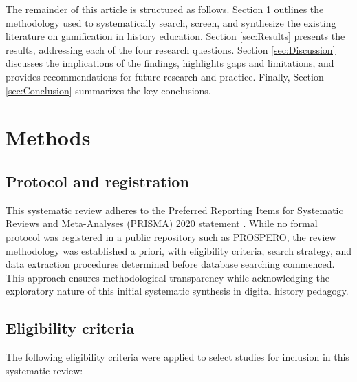 \documentclass[a4paper,fleqn]{cas-sc}
\begin{document}
The remainder of this article is structured as follows. Section \ref{sec:Methodology} outlines the methodology used to systematically search, screen, and synthesize the existing literature on gamification in history education. Section \ref{sec:Results} presents the results, addressing each of the four research questions. Section \ref{sec:Discussion} discusses the implications of the findings, highlights gaps and limitations, and provides recommendations for future research and practice. Finally, Section \ref{sec:Conclusion} summarizes the key conclusions.




\section{Methods}
\label{sec:Methodology}

\subsection{Protocol and registration}

This systematic review adheres to the Preferred Reporting Items for Systematic Reviews and Meta-Analyses (PRISMA) 2020 statement \citep{Page2021}. While no formal protocol was registered in a public repository such as PROSPERO, the review methodology was established a priori, with eligibility criteria, search strategy, and data extraction procedures determined before database searching commenced. This approach ensures methodological transparency while acknowledging the exploratory nature of this initial systematic synthesis in digital history pedagogy.

\subsection{Eligibility criteria}
The following eligibility criteria were applied to select studies for inclusion in this systematic review:
\end{document}
